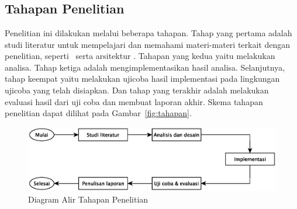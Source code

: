 \chapter{\babTiga}

\section{Tahapan Penelitian}

Penelitian ini dilakukan melalui beberapa tahapan. Tahap yang pertama
adalah studi literatur untuk mempelajari dan memahami materi-materi terkait
dengan penelitian, seperti \tracking~serta arsitektur \pubsub. Tahapan yang
kedua yaitu melakukan analisa. Tahap ketiga adalah mengimplementasikan hasil
analisa. Selanjutnya, tahap keempat yaitu melakukan ujicoba hasil implementasi
pada lingkungan ujicoba yang telah disiapkan. Dan tahap yang terakhir adalah
melakukan evaluasi hasil dari uji coba dan membuat laporan akhir. Skema tahapan
penelitian dapat dilihat pada Gambar~\ref{fig:tahapan}.

\noindent
\begin{figure}
  \centering
  \includegraphics[scale=0.60]
  {images/3-tahapan}
\caption{Diagram Alir Tahapan Penelitian}
\label{fig:sistem}
\end{figure}



